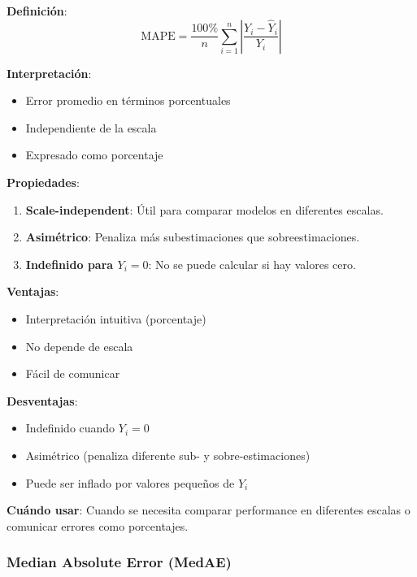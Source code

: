 \documentclass[
  doc,
  floatsintext,
  longtable,
  a4paper,
  nolmodern,
  notxfonts,
  notimes,
  12pt,
  colorlinks=true,linkcolor=blue,citecolor=blue,urlcolor=blue]{apa7}
\providecommand{\tightlist}{%
  \setlength{\itemsep}{0pt}\setlength{\parskip}{0pt}}
\begin{document}
\textbf{Definición}: \[
\text{MAPE} = \frac{100\%}{n} \sum_{i=1}^{n} \left|\frac{Y_i - \hat{Y}_i}{Y_i}\right|
\]

\textbf{Interpretación}:

\begin{itemize}
\tightlist
\item
  Error promedio en términos porcentuales
\item
  Independiente de la escala
\item
  Expresado como porcentaje
\end{itemize}

\textbf{Propiedades}:

\begin{enumerate}
\def\labelenumi{\arabic{enumi}.}
\item
  \textbf{Scale-independent}: Útil para comparar modelos en diferentes
  escalas.
\item
  \textbf{Asimétrico}: Penaliza más subestimaciones que
  sobreestimaciones.
\item
  \textbf{Indefinido para \(Y_i = 0\)}: No se puede calcular si hay
  valores cero.
\end{enumerate}

\textbf{Ventajas}:

\begin{itemize}
\tightlist
\item
  Interpretación intuitiva (porcentaje)
\item
  No depende de escala
\item
  Fácil de comunicar
\end{itemize}

\textbf{Desventajas}:

\begin{itemize}
\tightlist
\item
  Indefinido cuando \(Y_i = 0\)
\item
  Asimétrico (penaliza diferente sub- y sobre-estimaciones)
\item
  Puede ser inflado por valores pequeños de \(Y_i\)
\end{itemize}

\textbf{Cuándo usar}: Cuando se necesita comparar performance en
diferentes escalas o comunicar errores como porcentajes.

\subsubsection{Median Absolute Error
(MedAE)}\label{median-absolute-error-medae}
\end{document}

